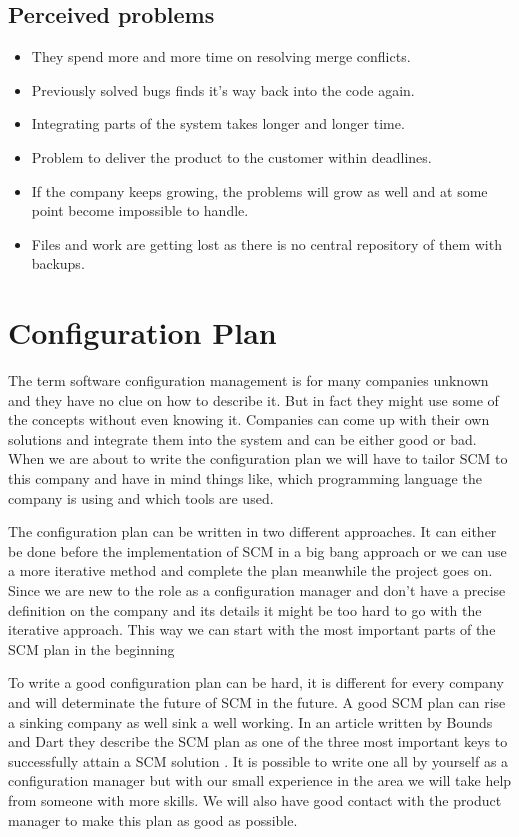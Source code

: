 \documentclass[a4paper,10pt]{article}
\begin{document}
\subsection{Perceived problems}

\begin{itemize}
\item They spend more and more time on resolving merge conflicts.
\item Previously solved bugs finds it’s way back into the code again.
\item Integrating parts of the system takes longer and longer time.
\item Problem to deliver the product to the customer within deadlines.
\item If the company keeps growing, the problems will grow as well and at some point become impossible to handle.
\item Files and work are getting lost as there is no central repository of them with backups.
\end{itemize}



\section{Configuration Plan}


The term software configuration management is for many companies unknown and they have no clue on how to describe it. But in fact they might use some of the concepts without even knowing it. Companies can come up with their own solutions and integrate them into the system and can be either good or bad. When we are about to write the configuration plan we will have to tailor SCM to this company and have in mind things like, which programming language the company is using and which tools are used.

The configuration plan can be written in two different approaches. \cite{SCMPLAN} It can either be done before the implementation of SCM in a big bang approach or we can use a more iterative method and complete the plan meanwhile the project goes on. 
Since we are new to the role as a configuration manager and don’t have a precise definition on the company and its details it might be too hard to go with the iterative approach. This way we can start with the most important parts of the SCM plan in the beginning

To write a good configuration plan can be hard, it is different for every company and will determinate the future of SCM in the future. A good SCM plan can rise a sinking company as well sink a well working. In an article written by Bounds and Dart they describe the SCM plan as one of the three most important keys to successfully attain a SCM solution \cite{BoundsDart}.  It is possible to write one all by yourself as a configuration manager but with our small experience in the area we will take help from someone with more skills. We will also have good contact with the product manager to make this plan as good as possible.
\end{document}
